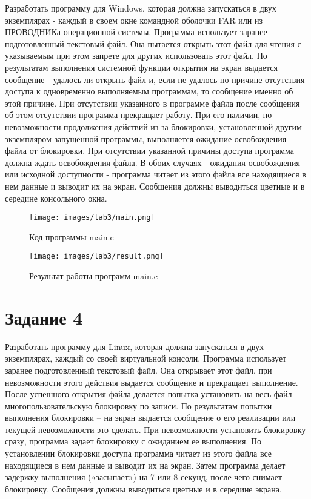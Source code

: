 \documentclass[14pt, a4paper]{article}
\begin{document}
    Разработать программу для Windows, которая должна запускаться в двух экземплярах - каждый в своем окне командной оболочки FAR или из ПРОВОДНИКа операционной системы. Программа использует заранее подготовленный текстовый файл. Она пытается открыть этот файл для чтения с указываемым при этом запрете для других использовать этот файл. По результатам выполнения системной функции открытия на экран выдается сообщение - удалось ли открыть файл и, если не удалось по причине отсутствия доступа к одновременно выполняемым программам, то сообщение именно об этой причине. При отсутствии указанного в программе файла после сообщения об этом отсутствии программа прекращает работу. При его наличии, но невозможности продолжения действий из-за блокировки, установленной другим экземпляром запущенной программы, выполняется ожидание освобождения файла от блокировки. При отсутствии указанной причины доступа программа должна ждать освобождения файла. В обоих случаях - ожидания освобождения или исходной доступности - программа читает из этого файла все находящиеся в нем данные и выводит их на экран. Сообщения должны выводиться цветные и в середине консольного окна.

    \begin{figure}[H]
        \centering
        \texttt{[image: images/lab3/main.png]}
        \caption{Код программы main.c}
    \end{figure}

    \begin{figure}[H]
        \centering
        \texttt{[image: images/lab3/result.png]}
        \caption{Результат работы программ main.c}
    \end{figure}

    \newpage

    \section*{Задание 4}

    Разработать программу для Linux, которая должна запускаться в двух экземплярах, каждый со своей виртуальной консоли. Программа использует заранее подготовленный текстовый файл. Она открывает этот файл, при невозможности этого действия выдается сообщение и прекращает выполнение. После успешного открытия файла делается попытка установить на весь файл многопользовательскую блокировку по записи. По результатам попытки выполнения блокировки – на экран выдается сообщение о его реализации или текущей невозможности это сделать. При невозможности установить блокировку сразу, программа задает блокировку с ожиданием ее выполнения. По установлении блокировки доступа программа читает из этого файла все находящиеся в нем данные и выводит их на экран. Затем программа делает задержку выполнения («засыпает») на 7 или 8 секунд, после чего снимает блокировку. Сообщения должны выводиться цветные и в середине экрана.
\end{document}
